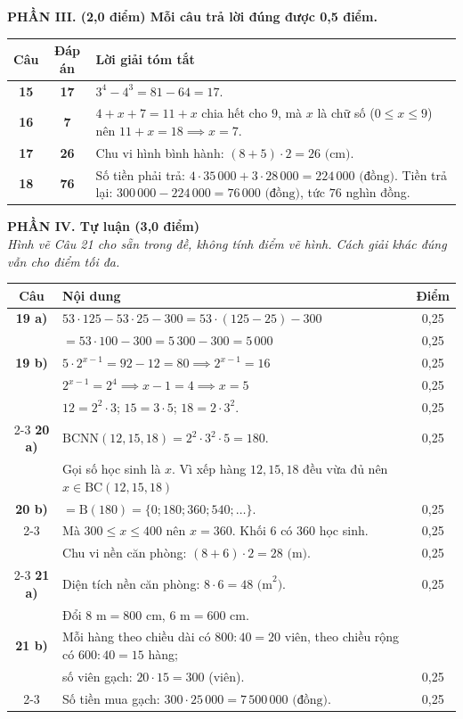 \vspace{4pt}

\noindent\textbf{PHẦN III. (2,0 điểm) Mỗi câu trả lời đúng được 0,5 điểm.}

\begin{center}
\renewcommand{\arraystretch}{1.3}
\begin{tabular}{|c|c|p{12.5cm}|}
	\hline
	\textbf{Câu} & \textbf{Đáp án} & \centering\textbf{Lời giải tóm tắt} \tabularnewline
	\hline
	\textbf{15} & \textbf{17} & $3^4 - 4^3 = 81 - 64 = 17$. \tabularnewline
	\hline
	\textbf{16} & \textbf{7} & $4 + x + 7 = 11 + x$ chia hết cho $9$, mà $x$ là chữ số ($0 \le x \le 9$) nên $11 + x = 18 \implies x = 7$. \tabularnewline
	\hline
	\textbf{17} & \textbf{26} & Chu vi hình bình hành: $(8 + 5) \cdot 2 = 26\text{ (cm)}$. \tabularnewline
	\hline
	\textbf{18} & \textbf{76} & Số tiền phải trả: $4 \cdot 35\,000 + 3 \cdot 28\,000 = 224\,000\text{ (đồng)}$. Tiền trả lại: $300\,000 - 224\,000 = 76\,000\text{ (đồng)}$, tức $76$ nghìn đồng. \tabularnewline
	\hline
\end{tabular}
\end{center}

\vspace{4pt}

\noindent\textbf{PHẦN IV. Tự luận (3,0 điểm)}\\
\textit{Hình vẽ Câu 21 cho sẵn trong đề, không tính điểm vẽ hình. Cách giải khác đúng vẫn cho điểm tối đa.}

\begin{center}
\renewcommand{\arraystretch}{1.3}
\begin{tabular}{|c|l|c|}
	\hline
	\textbf{Câu} & \centering\textbf{Nội dung} & \textbf{Điểm} \tabularnewline
	\hline
	\textbf{19 a)} & $53 \cdot 125 - 53 \cdot 25 - 300 = 53 \cdot (125 - 25) - 300$ & 0,25 \tabularnewline
	& $= 53 \cdot 100 - 300 = 5\,300 - 300 = 5\,000$ & 0,25 \tabularnewline
	\hline
	\textbf{19 b)} & $5 \cdot 2^{x-1} = 92 - 12 = 80 \implies 2^{x-1} = 16$ & 0,25 \tabularnewline
	& $2^{x-1} = 2^4 \implies x - 1 = 4 \implies x = 5$ & 0,25 \tabularnewline
	\hline
	& $12 = 2^2 \cdot 3$; $15 = 3 \cdot 5$; $18 = 2 \cdot 3^2$. & 0,25 \tabularnewline
	\cline{2-3}
	\textbf{20 a)} & $\text{BCNN}(12, 15, 18) = 2^2 \cdot 3^2 \cdot 5 = 180$. & 0,25 \tabularnewline
	\hline
	& Gọi số học sinh là $x$. Vì xếp hàng $12, 15, 18$ đều vừa đủ nên $x \in \text{BC}(12, 15, 18)$ & \tabularnewline
	\textbf{20 b)} & $= \text{B}(180) = \{0; 180; 360; 540; \dots\}$. & 0,25 \tabularnewline
	\cline{2-3}
	& Mà $300 \le x \le 400$ nên $x = 360$. Khối 6 có $360$ học sinh. & 0,25 \tabularnewline
	\hline
	& Chu vi nền căn phòng: $(8 + 6) \cdot 2 = 28\text{ (m)}$. & 0,25 \tabularnewline
	\cline{2-3}
	\textbf{21 a)} & Diện tích nền căn phòng: $8 \cdot 6 = 48\text{ (m}^2\text{)}$. & 0,25 \tabularnewline
	\hline
	& Đổi $8\text{ m} = 800\text{ cm}$, $6\text{ m} = 600\text{ cm}$. & \tabularnewline
	\textbf{21 b)} & Mỗi hàng theo chiều dài có $800 : 40 = 20$ viên, theo chiều rộng có $600 : 40 = 15$ hàng; & \tabularnewline
	& số viên gạch: $20 \cdot 15 = 300$ (viên). & 0,25 \tabularnewline
	\cline{2-3}
	& Số tiền mua gạch: $300 \cdot 25\,000 = 7\,500\,000\text{ (đồng)}$. & 0,25 \tabularnewline
	\hline
\end{tabular}
\end{center}
